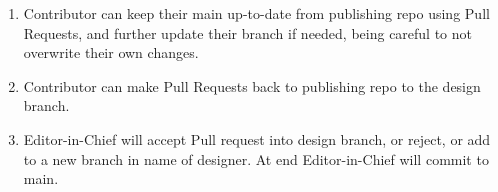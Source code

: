 \documentclass{article}
\begin{document}
\begin{itemize}
\begin{enumerate}
\item Contributor can keep their main up-to-date from publishing repo using Pull Requests, and further update their branch if needed, being careful to not overwrite their own changes.


\item Contributor can make Pull Requests back to publishing repo to the design branch.


\item Editor-in-Chief will accept Pull request into design branch, or reject, or add to a new branch in name of designer. At end Editor-in-Chief will commit to main.


\end{enumerate}




\end{itemize}
\end{document}
